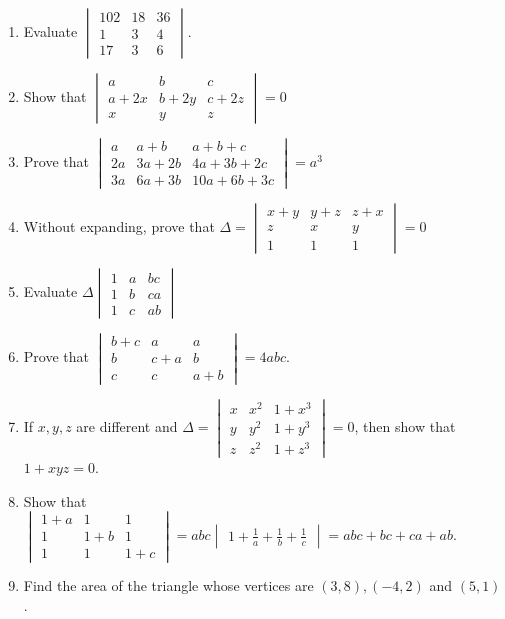 \documentclass{article}
\theoremstyle{remark}
\begin{document}
\begin{enumerate}
\item Evaluate $\begin{vmatrix}102&18&36 \\ 1&3&4 \\ 17&3&6 \end{vmatrix}$.
\item Show that $\begin{vmatrix}a&b&c \\ a+2x&b+2y&c+2z \\ x&y&z \end{vmatrix} = 0$
\item Prove that $\begin{vmatrix}a&a+b&a+b+c \\ 2a&3a+2b&4a+3b+2c \\3a&6a+3b&10a+6b+3c \end{vmatrix}=a^3$
\item Without expanding, prove that $\Delta=\begin{vmatrix}x+y&y+z&z+x \\ z&x&y \\ 1&1&1 \end{vmatrix}=0$
\item Evaluate $\Delta \begin{vmatrix}1&a&bc \\1&b&ca \\1&c&ab \end{vmatrix}$
\item Prove that $\begin{vmatrix}b+c&a&a \\b&c+a&b \\c&c&a+b \end{vmatrix} = 4abc$.
\item If $x, y, z$ are different and $\Delta=\begin{vmatrix}x&x^2&1+x^3 \\y&y^2&1+y^3 \\z&z^2&1+z^3 \end{vmatrix} = 0$, then show that $1+xyz = 0$.
\item Show that $\begin{vmatrix} 1+a&1&1 \\ 1&1+b&1 \\ 1&1&1+c \end{vmatrix} = abc \begin{vmatrix}1+\frac{1}{a}+\frac{1}{b}+\frac{1}{c} \end{vmatrix}= abc+bc+ca+ab $.
\item Find the area of the triangle whose vertices are $(3,8), (-4,2)$ and $(5,1)$.

\end{enumerate}
\end{document}
